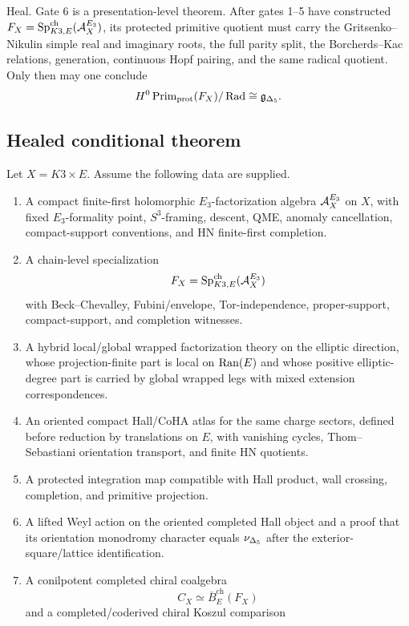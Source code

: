 Heal.  Gate 6 is a presentation-level theorem.  After gates 1--5 have
constructed \(F_X=\operatorname{Sp}^{\operatorname{ch}}_{K3,E}(\mathcal A^{E_3}_X)\), its protected primitive quotient
must carry the Gritsenko--Nikulin simple real and imaginary roots, the full
parity split, the Borcherds--Kac relations, generation, continuous Hopf
pairing, and the same radical quotient.  Only then may one conclude
\[
        H^0\operatorname{Prim}_{\operatorname{prot}}(F_X)/\operatorname{Rad}
        \cong
        \mathfrak g_{\Delta_5} .
\]

\subsection{Healed conditional theorem}

\begin{theorem}
Let \(X=K3\times E\).  Assume the following data are supplied.
\begin{enumerate}
\item A compact finite-first holomorphic \(E_3\)-factorization algebra
\(\mathcal A^{E_3}_X\) on \(X\), with fixed \(E_3\)-formality point, \(S^3\)-framing,
descent, QME, anomaly cancellation, compact-support conventions, and HN
finite-first completion.
\item A chain-level specialization
\[
        F_X=\operatorname{Sp}^{\operatorname{ch}}_{K3,E}(\mathcal A^{E_3}_X)
\]
with Beck--Chevalley, Fubini/envelope, Tor-independence, proper-support,
compact-support, and completion witnesses.
\item A hybrid local/global wrapped factorization theory on the elliptic
direction, whose projection-finite part is local on \(\operatorname{Ran}(E)\) and whose
positive elliptic-degree part is carried by global wrapped legs with mixed
extension correspondences.
\item An oriented compact Hall/CoHA atlas for the same charge sectors,
defined before reduction by translations on \(E\), with vanishing cycles,
Thom--Sebastiani orientation transport, and finite HN quotients.
\item A protected integration map compatible with Hall product, wall
crossing, completion, and primitive projection.
\item A lifted Weyl action on the oriented completed Hall object and a
proof that its orientation monodromy character equals
\(\nu_{\Delta_5}\) after the exterior-square/lattice identification.
\item A conilpotent completed chiral coalgebra
\[
        C_X\simeq \overline B^{\operatorname{ch}}_E(F_X)
\]
and a completed/coderived chiral Koszul comparison

\end{enumerate}
\end{theorem}
